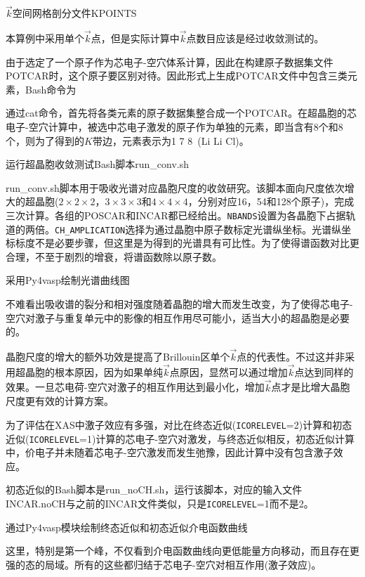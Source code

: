 $\vec k$空间网格剖分文件\textrm{KPOINTS}

本算例中采用单个$\vec k$点，但是实际计算中$\vec k$点数目应该是经过收敛测试的。

由于选定了一个原子作为芯电子-空穴体系计算，因此在构建原子数据集文件\textrm{POTCAR}时，这个原子要区别对待。因此形式上生成\textrm{POTCAR}文件中包含三类元素，\textrm{Bash}命令为

通过\textrm{cat}命令，首先将各类元素的原子数据集整合成一个\textrm{POTCAR}。在超晶胞的芯电子-空穴计算中，被选中芯电子激发的原子作为单独的元素，即当含有8个和8个，则为了得到的$K$带边，元素表示为\textrm{1 7 8~(Li Li Cl)}。

运行超晶胞收敛测试\textrm{Bash}脚本\textrm{run\_conv.sh}

\textrm{run\_conv.sh}脚本用于吸收光谱对应晶胞尺度的收敛研究。该脚本面向尺度依次增大的超晶胞($2\times2\times2$，$3\times3\times3$和$4\times4\times4$，分别对应16，54和128个原子)，完成三次计算。各组的\textrm{POSCAR}和\textrm{INCAR}都已经给出。\texttt{NBANDS}设置为各晶胞下占据轨道的两倍。\texttt{CH\_AMPLICATION}选择为通过晶胞中原子数标定光谱纵坐标。光谱纵坐标标度不是必要步骤，但这里是为得到的光谱具有可比性。为了使得谱函数对比更合理，不至于剧烈的增衰，将谱函数除以原子数。

采用\textrm{Py4vasp}绘制光谱曲线图

不难看出吸收谱的裂分和相对强度随着晶胞的增大而发生改变，为了使得芯电子-空穴对激子与重复单元中的影像的相互作用尽可能小，适当大小的超晶胞是必要的。

晶胞尺度的增大的额外功效是提高了\textrm{Brillouin}区单个$\vec k$点的代表性。不过这并非采用超晶胞的根本原因，因为如果单纯$\vec k$点原因，显然可以通过增加$\vec k$点达到同样的效果。一旦芯电荷-空穴对激子的相互作用达到最小化，增加$\vec k$点才是比增大晶胞尺度更有效的计算方案。

为了评估在\textrm{XAS}中激子效应有多强，对比在终态近似(\texttt{ICORELEVEL}=2)计算和初态近似(\texttt{ICORELEVEL}=1)计算的芯电子-空穴对激发，与终态近似相反，初态近似计算中，价电子并未随着芯电子-空穴激发而发生弛豫，因此计算中没有包含激子效应。

初态近似的\textrm{Bash}脚本是\textrm{run\_noCH.sh}，运行该脚本，对应的输入文件\textrm{INCAR.noCH}与之前的\textrm{INCAR}文件类似，只是\texttt{ICORELEVEL}=1而不是2。

通过\textrm{Py4vasp}模块绘制终态近似和初态近似介电函数曲线

这里，特别是第一个峰，不仅看到介电函数曲线向更低能量方向移动，而且存在更强的态的局域。所有的这些都归结于芯电子-空穴对相互作用(激子效应)。

